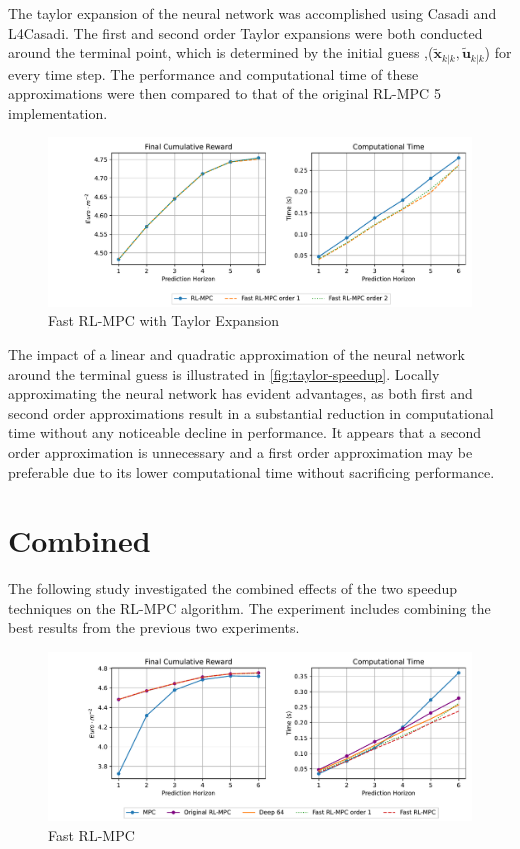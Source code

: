 The taylor expansion of the neural network was accomplished using Casadi and L4Casadi. The first and second order Taylor expansions were both conducted around the terminal point, which is determined by the initial guess ,($\tilde{\mathbf{x}}_{k|k},\tilde{\mathbf{u}}_{k|k}$) for every time step. The performance and computational time of these approximations were then compared to that of the original RL-MPC 5 implementation.


\begin{figure}[H]
	\centering
	\includegraphics[width=\textwidth]{figures/taylor_speed_up.pdf}
	\caption{Fast RL-MPC with Taylor Expansion}
	\label{fig:taylor-speedup}
\end{figure}

The impact of a linear and quadratic approximation of the neural network around the terminal guess is illustrated in \autoref{fig:taylor-speedup}. Locally approximating the neural network has evident advantages, as both first and second order approximations result in a substantial reduction in computational time without any noticeable decline in performance. It appears that a second order approximation is unnecessary and a first order approximation may be preferable due to its lower computational time without sacrificing performance.


\section{Combined}
The following study investigated the combined effects of the two speedup techniques on the RL-MPC algorithm. The experiment includes combining the best results from the previous two experiments.


\begin{figure}[H]
	\centering
	\includegraphics[width=\textwidth]{figures/final_speed_up.pdf}
	\caption{Fast RL-MPC}
	\label{fig:final-speedup}
\end{figure}


